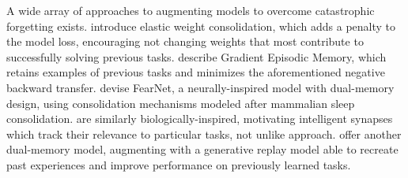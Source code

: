 A wide array of approaches to augmenting models to overcome catastrophic forgetting exists. \textcite{Kirkpatrick2017} introduce elastic weight consolidation, which adds a penalty to the model loss, encouraging not changing weights that most contribute to successfully solving previous tasks. \textcite{Lopez-Paz2017} describe Gradient Episodic Memory, which retains examples of previous tasks and minimizes the aforementioned negative backward transfer. \textcite{Kemker2018} devise FearNet, a neurally-inspired model with dual-memory design, using consolidation mechanisms modeled after mammalian sleep consolidation. \textcite{Zenke2017} are similarly biologically-inspired, motivating intelligent synapses which track their relevance to particular tasks, not unlike  approach. \textcite{Kamra2017} offer another dual-memory model, augmenting with a generative replay model able to recreate past experiences and improve performance on previously learned tasks. 

